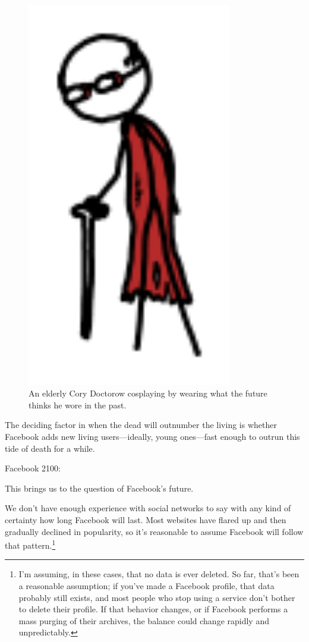 {\begin{figure}[!htbp]
\centering
\includegraphics[scale=0.5, max width=0.8\textwidth]{imgs/a/69/facebook_cory.png}
\caption{An elderly Cory Doctorow cosplaying by wearing what the future thinks he wore in the past.}
\end{figure}

{The deciding factor in when the dead will outnumber the living is whether Facebook adds new living users—ideally, young ones—fast enough to outrun this tide of death for a while.}

{Facebook 2100:}

{This brings us to the question of Facebook's future.}

{We don't have enough experience with social networks to say with any kind of certainty how long Facebook will last. Most websites have flared up and then gradually declined in popularity, so it's reasonable to assume Facebook will follow that pattern.{\footnote{I'm assuming, in these cases, that no data is ever deleted. So far, that's been a reasonable assumption; if you've made a Facebook profile, that data probably still exists, and most people who stop using a service don't bother to delete their profile. If that behavior changes, or if Facebook performs a mass purging of their archives, the balance could change rapidly and unpredictably.} } }

}

